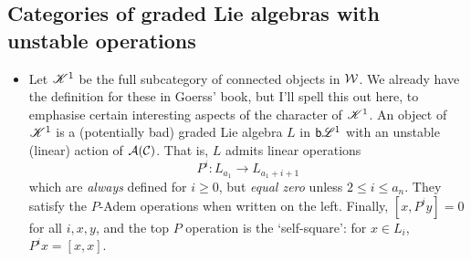 \documentclass[11pt]{article}
\newcommand{\BadLie}[1]{\mathsf{b}{\scrL}^{#1}}%
\newcommand{\LL}[1]{{\scrK}^{#1}}%
\newcommand{\Palgebra}{\calA(\calC)}
\begin{document}
\begin{CategoriesOfInterest}
\subsection*{Categories of graded Lie algebras with unstable operations}
\begin{itemize}
\setlength{\parindent}{.25in}
\item Let $\LL{1}$ be the full subcategory of connected objects in $\mathcal{W}$. We already have the definition for these in Goerss' book, but I'll spell this out here, to emphasise certain interesting aspects of the character of $\LL{1}$.
An object of $\LL{1}$ is a (potentially bad) graded Lie algebra $L$ in $\BadLie{1}$ with an unstable (linear) action of $\Palgebra$.
That is, $L$ admits linear operations
\[P^i:L_{a_1}\to L_{a_1+i+1}\]
which are \emph{always} defined for $i\geq0$, but \emph{equal zero} unless $2\leq i\leq a_n$. They satisfy the $P$-Adem operations when written on the left. Finally, $[x,P^iy]=0$ for all $i,x,y$, and the top $P$ operation is the `self-square': for $x\in L_{i}$, $P^{i}x=[x,x]$.


\end{itemize}
\end{CategoriesOfInterest}
\end{document}
